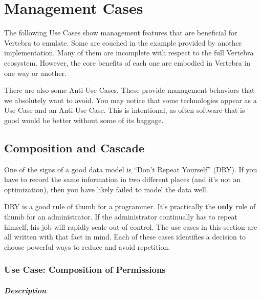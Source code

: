 \chapter{Management Cases}

The following Use Cases show management features that are beneficial for Vertebra to emulate.  Some are couched in the example provided by another implementation.  Many of them are incomplete with respect to the full Vertebra ecosystem.  However, the core benefits of each one are embodied in Vertebra in one way or another.

There are also some Anti-Use Cases.  These provide management behaviors that we absolutely want to avoid.  You may notice that some technologies appear as a Use Case and an Anti-Use Case.  This is intentional, as often software that is good would be better without some of its baggage.

\section{Composition and Cascade}

One of the signs of a good data model is ``Don't Repeat Yourself'' (DRY).  If you have to record the same information in two different places (and it's not an optimization), then you have likely failed to model the data well.

DRY is a good rule of thumb for a programmer.  It's practically the \textbf{only} rule of thumb for an administrator.  If the administrator continually has to repeat himself, his job will rapidly scale out of control.  The use cases in this section are all written with that fact in mind.  Each of these cases identifies a decision to choose powerful ways to reduce and avoid repetition.

\subsection{Use Case: Composition of Permissions}

\paragraph{Description}

